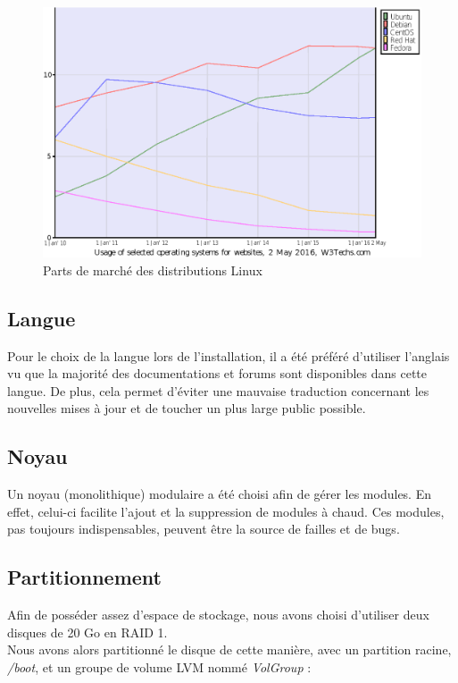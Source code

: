 \begin{figure}[h]
  \centering
  \includegraphics[scale=0.95]
  {textures/images/installation/distributions.eps}
  \caption{Parts de marché des distributions Linux}
\end{figure}

\newpage


\subsection{Langue}
\label{subsec:langue}

Pour le choix de la langue lors de l'installation, il a été préféré d'utiliser
l'anglais vu que la majorité des documentations et forums sont disponibles dans
cette langue. De plus, cela permet d'éviter une mauvaise traduction concernant
les nouvelles mises à jour et de toucher un plus large public possible.


\subsection{Noyau}
\label{subsec:noyau}

Un noyau (monolithique) modulaire a été choisi afin de gérer les
modules. En effet, celui-ci facilite l'ajout et la suppression de modules à
chaud. Ces modules, pas toujours indispensables, peuvent être la source de
failles et de bugs.


\subsection{Partitionnement}
\label{subsec:partitionnement}

Afin de posséder assez d'espace de stockage, nous avons choisi d'utiliser deux
disques de 20 Go en RAID 1. \\
Nous avons alors partitionné le disque de cette manière, avec un partition racine,
\textit{/boot}, et un groupe de volume LVM nommé \textit{VolGroup} : \\

